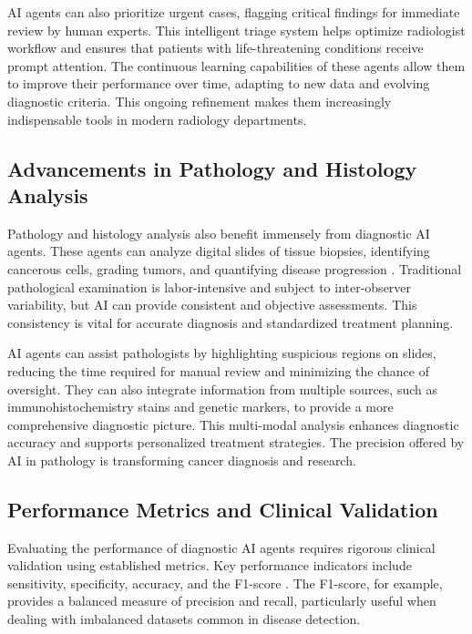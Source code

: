 \documentclass[12pt,a4paper]{article}
\begin{document}
AI agents can also prioritize urgent cases, flagging critical findings for immediate review by human experts. This intelligent triage system helps optimize radiologist workflow and ensures that patients with life-threatening conditions receive prompt attention. The continuous learning capabilities of these agents allow them to improve their performance over time, adapting to new data and evolving diagnostic criteria. This ongoing refinement makes them increasingly indispensable tools in modern radiology departments.

\subsection{Advancements in Pathology and Histology Analysis}
\label{subsec:pathology-advancements}
Pathology and histology analysis also benefit immensely from diagnostic AI agents. These agents can analyze digital slides of tissue biopsies, identifying cancerous cells, grading tumors, and quantifying disease progression \cite{campanella2019deep}. Traditional pathological examination is labor-intensive and subject to inter-observer variability, but AI can provide consistent and objective assessments. This consistency is vital for accurate diagnosis and standardized treatment planning.

AI agents can assist pathologists by highlighting suspicious regions on slides, reducing the time required for manual review and minimizing the chance of oversight. They can also integrate information from multiple sources, such as immunohistochemistry stains and genetic markers, to provide a more comprehensive diagnostic picture. This multi-modal analysis enhances diagnostic accuracy and supports personalized treatment strategies. The precision offered by AI in pathology is transforming cancer diagnosis and research.

\subsection{Performance Metrics and Clinical Validation}
\label{subsec:performance-metrics}
Evaluating the performance of diagnostic AI agents requires rigorous clinical validation using established metrics. Key performance indicators include sensitivity, specificity, accuracy, and the F1-score \cite{saito2015precision}. The F1-score, for example, provides a balanced measure of precision and recall, particularly useful when dealing with imbalanced datasets common in disease detection.
\end{document}
